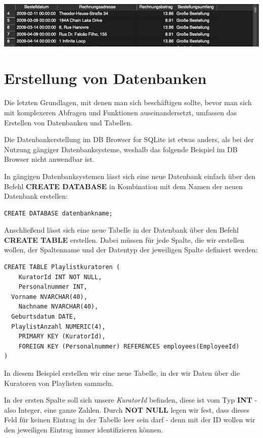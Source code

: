 \documentclass[
]{book}
\begin{document}
\includegraphics[width=10.41667in,height=\textheight]{img-FUNC9.png}

\hypertarget{erstellung-von-datenbanken}{%
\chapter{Erstellung von Datenbanken}\label{erstellung-von-datenbanken}}

Die letzten Grundlagen, mit denen man sich beschäftigen sollte, bevor man sich mit komplexeren Abfragen und Funktionen auseinandersetzt, umfassen das Erstellen von Datenbanken und Tabellen.

Die Datenbankerstellung im DB Browser for SQLite ist etwas anders, als bei der Nutzung gängiger Datenbanksysteme, weshalb das folgende Beispiel im DB Browser nicht anwendbar ist.

In gängigen Datenbanksystemen lässt sich eine neue Datenbank einfach über den Befehl \textbf{CREATE DATABASE} in Kombination mit dem Namen der neuen Datenbank erstellen:

\begin{verbatim}
CREATE DATABASE datenbankname;
\end{verbatim}

Anschließend lässt sich eine neue Tabelle in der Datenbank über den Befehl \textbf{CREATE TABLE} erstellen. Dabei müssen für jede Spalte, die wir erstellen wollen, der Spaltenname und der Datentyp der jeweiligen Spalte definiert werden:

\begin{verbatim}
CREATE TABLE Playlistkuratoren (
    KuratorId INT NOT NULL,
    Personalnummer INT,
  Vorname NVARCHAR(40),
    Nachname NVARCHAR(40),
  Geburtsdatum DATE,
  PlaylistAnzahl NUMERIC(4),
    PRIMARY KEY (KuratorId),
    FOREIGN KEY (Personalnummer) REFERENCES employees(EmployeeId)
)
\end{verbatim}

In diesem Beispiel erstellen wir eine neue Tabelle, in der wir Daten über die Kuratoren von Playlisten sammeln.

In der ersten Spalte soll sich unsere \emph{KuratorId} befinden, diese ist vom Typ \textbf{INT} - also Integer, eine ganze Zahlen. Durch \textbf{NOT NULL} legen wir fest, dass dieses Feld für keinen Eintrag in der Tabelle leer sein darf - denn mit der ID wollen wir den jeweiligen Eintrag immer identifizieren können.
\end{document}
